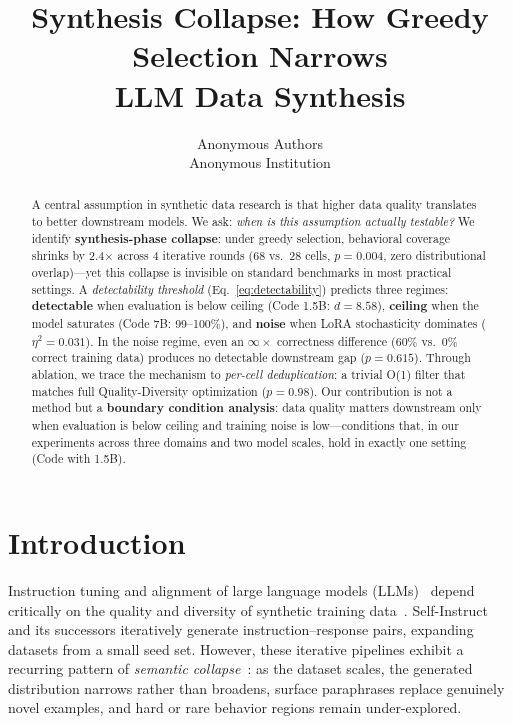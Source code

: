 \documentclass{article}
\title{
  Synthesis Collapse: How Greedy Selection Narrows\\
  LLM Data Synthesis
}
\author{
  Anonymous Authors \\
  Anonymous Institution
}
\begin{document}
\maketitle

\begin{abstract}
A central assumption in synthetic data research is that higher data quality translates to better downstream models.
We ask: \emph{when is this assumption actually testable?}
We identify \textbf{synthesis-phase collapse}: under greedy selection, behavioral coverage shrinks by 2.4$\times$ across 4 iterative rounds (68 vs.\ 28 cells, $p{=}0.004$, zero distributional overlap)---yet this collapse is invisible on standard benchmarks in most practical settings.
A \emph{detectability threshold} (Eq.~\ref{eq:detectability}) predicts three regimes: \textbf{detectable} when evaluation is below ceiling (Code 1.5B: $d{=}8.58$), \textbf{ceiling} when the model saturates (Code 7B: 99--100\%), and \textbf{noise} when LoRA stochasticity dominates ($\eta^2{=}0.031$).
In the noise regime, even an $\infty\times$ correctness difference (60\% vs.\ 0\% correct training data) produces no detectable downstream gap ($p{=}0.615$).
Through ablation, we trace the mechanism to \emph{per-cell deduplication}: a trivial O(1) filter that matches full Quality-Diversity optimization ($p{=}0.98$).
Our contribution is not a method but a \textbf{boundary condition analysis}: data quality matters downstream only when evaluation is below ceiling and training noise is low---conditions that, in our experiments across three domains and two model scales, hold in exactly one setting (Code with 1.5B).
\end{abstract}

\section{Introduction}
\label{sec:intro}

Instruction tuning and alignment of large language models (LLMs)~\citep{zhao2024survey_alignment, touvron2023llama} depend critically on the quality and diversity of synthetic training data~\citep{self_instruct_2023, evol_instruct_2023, alpaca_2023}.
Self-Instruct~\citep{self_instruct_2023} and its successors iteratively generate instruction--response pairs, expanding datasets from a small seed set.
However, these iterative pipelines exhibit a recurring pattern of \emph{semantic collapse}~\citep{model_collapse_2023, data_collapse_2024}: as the dataset scales, the generated distribution narrows rather than broadens, surface paraphrases replace genuinely novel examples, and hard or rare behavior regions remain under-explored.
\end{document}
